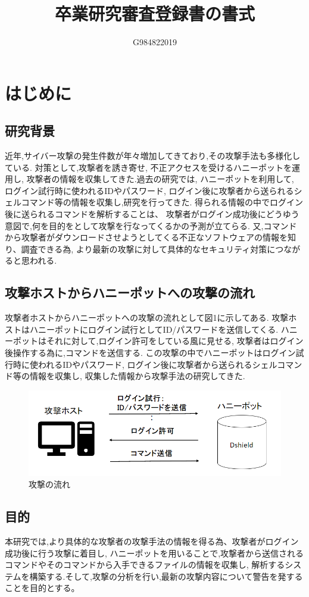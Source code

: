 \documentclass{entry}
\title{卒業研究審査登録書の書式}
\author{G984822019}{吉村　直将}
\begin{document}
\maketitle

\section{はじめに}
\subsection{研究背景}
近年,サイバー攻撃の発生件数が年々増加してきており,その攻撃手法も多様化している.
対策として,攻撃者を誘き寄せ,
不正アクセスを受けるハニーポットを運用し,
攻撃者の情報を収集してきた.過去の研究では,
ハニーポットを利用して,
ログイン試行時に使われるIDやパスワード,
ログイン後に攻撃者から送られるシェルコマンド等の情報を収集し,研究を行ってきた.
得られる情報の中でログイン後に送られるコマンドを解析することは、
攻撃者がログイン成功後にどうゆう意図で,何を目的をとして攻撃を行なってくるかの予測が立てらる.
又,コマンドから攻撃者がダウンロードさせようとしてくる不正なソフトウェアの情報を知り、調査できる為,
より最新の攻撃に対して具体的なセキュリティ対策につながると思われる.

\subsection{攻撃ホストからハニーポットへの攻撃の流れ}
攻撃者ホストからハニーポットへの攻撃の流れとして図1に示してある.
攻撃ホストはハニーポットにログイン試行としてID/パスワードを送信してくる.
ハニーポットはそれに対して,ログイン許可をしている風に見せる,
攻撃者はログイン後操作する為に,コマンドを送信する.
この攻撃の中でハニーポットはログイン試行時に使われるIDやパスワード,
ログイン後に攻撃者から送られるシェルコマンド等の情報を収集し,
収集した情報から攻撃手法の研究してきた.　
\begin{figure}[htbp]
	\centering
	\includegraphics[width=\hsize]{honeypot1.png}
	\caption{攻撃の流れ}
\end{figure}
\subsection{目的}
本研究では,より具体的な攻撃者の攻撃手法の情報を得る為、攻撃者がログイン成功後に行う攻撃に着目し,
ハニーポットを用いることで,攻撃者から送信されるコマンドやそのコマンドから入手できるファイルの情報を収集し,
解析するシステムを構築する.そして,攻撃の分析を行い,最新の攻撃内容について警告を発することを目的とする。
\end{document}
